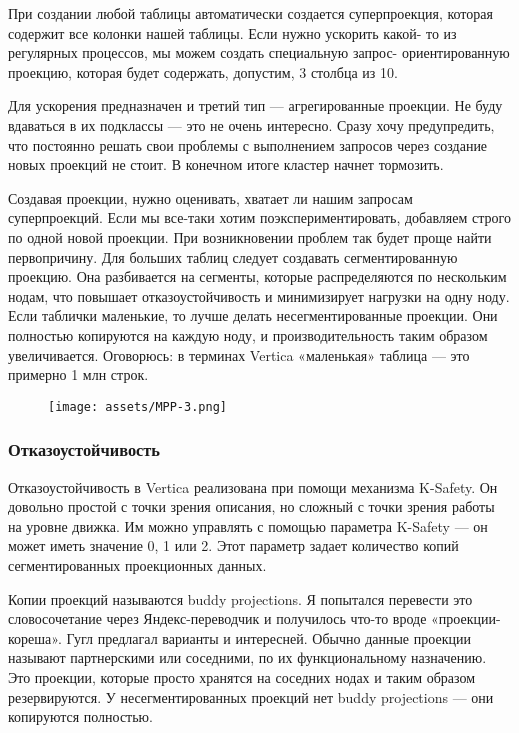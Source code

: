 При создании любой таблицы автоматически создается суперпроекция,
которая содержит все колонки нашей таблицы. Если нужно ускорить какой-
то из регулярных процессов, мы можем создать специальную запрос-
ориентированную проекцию, которая будет содержать, допустим, 3 столбца
из 10.

Для ускорения предназначен и третий тип — агрегированные проекции. Не
буду вдаваться в их подклассы — это не очень интересно. Сразу хочу
предупредить, что постоянно решать свои проблемы с выполнением
запросов через создание новых проекций не стоит. В конечном итоге
кластер начнет тормозить.

Создавая проекции, нужно оценивать, хватает ли нашим запросам
суперпроекций. Если мы все-таки хотим поэкспериментировать, добавляем
строго по одной новой проекции. При возникновении проблем так будет
проще найти первопричину. Для больших таблиц следует создавать
сегментированную проекцию. Она разбивается на сегменты, которые
распределяются по нескольким нодам, что повышает отказоустойчивость и
минимизирует
нагрузки на одну ноду. Если таблички маленькие, то лучше делать
несегментированные
проекции. Они полностью копируются на каждую ноду, и
производительность таким образом увеличивается. Оговорюсь: в терминах
Vertica «маленькая» таблица — это примерно 1 млн строк.

\begin{figure}[ht!]
	\centering
	\texttt{[image: assets/MPP-3.png]}
	\caption{} 
\end{figure}
\FloatBarrier

\subsubsection{Отказоустойчивость}

Отказоустойчивость в Vertica реализована при помощи механизма K-Safety.
Он довольно
простой с точки зрения описания, но сложный с точки зрения работы на
уровне движка. Им можно управлять с помощью параметра K-Safety — он
может иметь значение 0, 1 или 2. Этот параметр задает количество копий
сегментированных проекционных данных.

Копии проекций называются buddy projections. Я попытался перевести это
словосочетание через Яндекс-переводчик и получилось что-то вроде
«проекции-кореша». Гугл предлагал варианты и интересней. Обычно
данные проекции называют партнерскими или соседними, по их
функциональному назначению. Это проекции, которые просто хранятся на
соседних нодах и таким образом резервируются. У несегментированных
проекций нет buddy projections — они копируются полностью.

